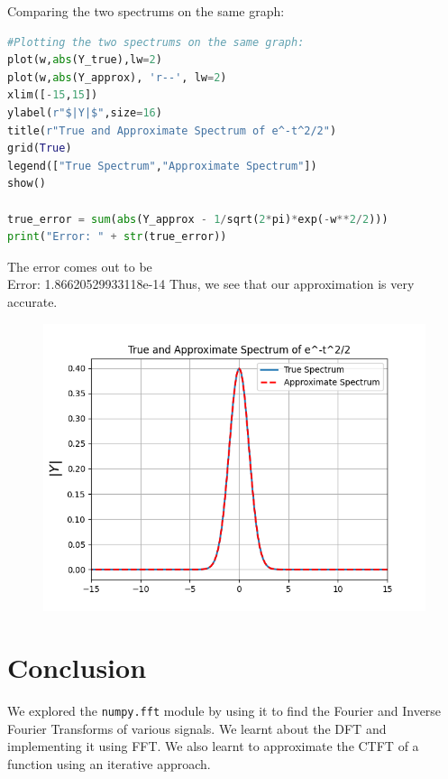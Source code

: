 \documentclass[11pt, a4paper]{article}
\begin{document}
Comparing the two spectrums on the same graph:
\begin{lstlisting}[language = Python]
#Plotting the two spectrums on the same graph:
plot(w,abs(Y_true),lw=2)
plot(w,abs(Y_approx), 'r--', lw=2)
xlim([-15,15])
ylabel(r"$|Y|$",size=16)
title(r"True and Approximate Spectrum of e^-t^2/2")
grid(True)
legend(["True Spectrum","Approximate Spectrum"])
show()

true_error = sum(abs(Y_approx - 1/sqrt(2*pi)*exp(-w**2/2)))
print("Error: " + str(true_error))
\end{lstlisting}
The error comes out to be \\
Error: 1.86620529933118e-14
Thus, we see that our approximation is very accurate.

\begin{figure}[H]
    \centering
    \includegraphics[scale = 0.8]{Figure_10.png}
\end{figure}

 \section{Conclusion}
We explored the \texttt{numpy.fft} module by using it to find the Fourier and Inverse Fourier Transforms of various signals. We learnt about the DFT and implementing it using FFT. We also learnt to approximate the CTFT of a function using an iterative approach.
\end{document}
